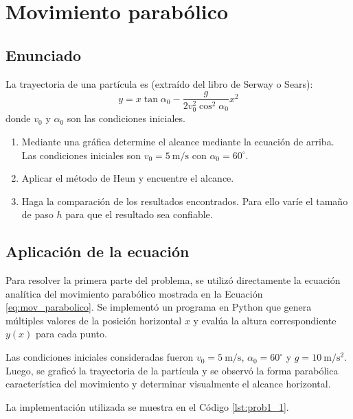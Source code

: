\section{Movimiento parabólico}

\subsection{Enunciado}
La trayectoria de una partícula es (extraído del libro de Serway o Sears):
\begin{equation}
    y = x \tan \alpha_0 - \frac{g}{2v_0^2 \cos^2 \alpha_0} x^2
    \label{eq:mov_parabolico}
\end{equation}
donde $v_0$ y $\alpha_0$ son las condiciones iniciales.

\begin{enumerate}
    \item Mediante una gráfica determine el alcance mediante la ecuación de arriba. Las condiciones iniciales son $v_0 = \SI{5}{\meter/\second}$ con $\alpha_0 = 60^\circ$.
    \item Aplicar el método de Heun y encuentre el alcance.
    \item Haga la comparación de los resultados encontrados. Para ello varíe el tamaño de paso $h$ para que el resultado sea confiable.
\end{enumerate}

\subsection{Aplicación de la ecuación}

Para resolver la primera parte del problema, se utilizó directamente la ecuación analítica del movimiento parabólico mostrada en la Ecuación \ref{eq:mov_parabolico}. Se implementó un programa en Python que genera múltiples valores de la posición horizontal $x$ y evalúa la altura correspondiente $y(x)$ para cada punto.

Las condiciones iniciales consideradas fueron $v_0 = \SI{5}{\meter/\second}$, $\alpha_0 = 60^\circ$ y $g = \SI{10}{\meter/\second^2}$. Luego, se graficó la trayectoria de la partícula y se observó la forma parabólica característica del movimiento y determinar visualmente el alcance horizontal.

La implementación utilizada se muestra en el Código \ref{lst:prob1_1}.


